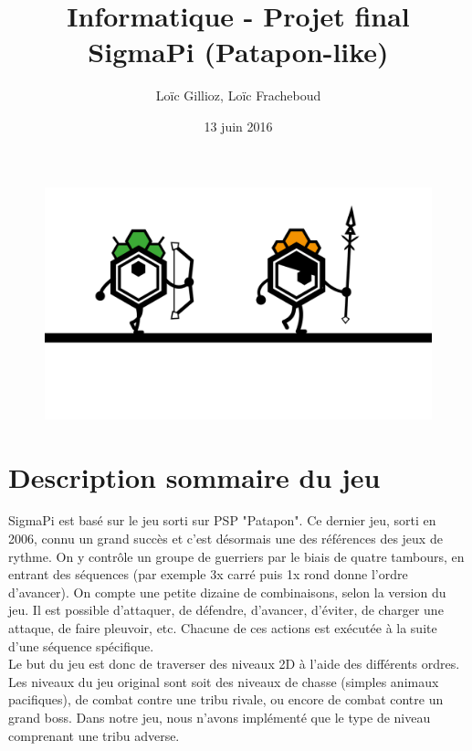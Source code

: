 \documentclass[a4paper,10pt]{article}
\author{Loïc Gillioz, Loïc Fracheboud}
\title{Informatique - Projet final \\ \Huge SigmaPi (Patapon-like)}
\date{13 juin 2016}
\begin{document}
 \maketitle

 \begin{figure}[!h]
 \centering
 \vspace{80pt}
 \includegraphics[scale=0.2]{images/titre}
 \end{figure}
 \pagebreak
 
 \section{Description sommaire du jeu}
  SigmaPi est basé sur le jeu sorti sur PSP "Patapon". Ce dernier jeu, sorti en 2006, connu un grand succès et c'est désormais une des références des jeux de rythme. On y contrôle un groupe de guerriers par le biais de quatre tambours, en entrant des séquences (par exemple 3x carré puis 1x rond donne l'ordre d'avancer). On compte une petite dizaine de combinaisons, selon la version du jeu. Il est possible d'attaquer, de défendre, d'avancer, d'éviter, de charger une attaque, de faire pleuvoir, etc. Chacune de ces actions est exécutée à la suite d'une séquence spécifique. \\
Le but du jeu est donc de traverser des niveaux 2D à l'aide des différents ordres. Les niveaux du jeu original sont soit des niveaux de chasse (simples animaux pacifiques), de combat contre une tribu rivale, ou encore de combat contre un grand boss.
Dans notre jeu, nous n'avons implémenté que le type de niveau comprenant une tribu adverse.
\end{document}

